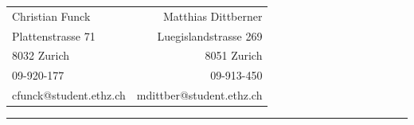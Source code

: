 \begin{tabular*}{\textwidth}{@{\extracolsep{\fill} } lr}
	Christian Funck					&	Matthias Dittberner				\\
	Plattenstrasse 71				&	Luegislandstrasse 269			\\
	8032 Zurich							&	8051 Zurich								\\
	09-920-177							& 09-913-450								\\
	cfunck@student.ethz.ch	&	mdittber@student.ethz.ch	\\
\end{tabular*}

\rule{\textwidth}{0.4pt}